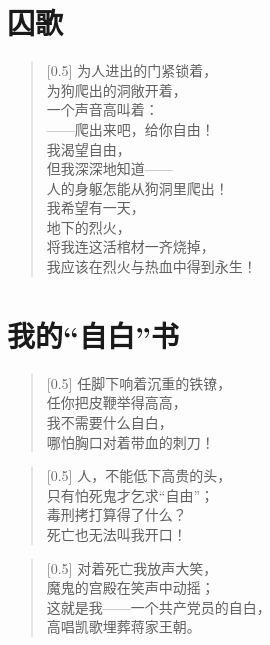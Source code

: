 \documentclass[12pt,UTF-8,openany]{ctexbook}
\begin{document}
\chapter{囚歌}

\begin{large}
    
    \begin{verse}[0.5\linewidth]
        为人进出的门紧锁着， \\
        为狗爬出的洞敞开着， \\
        一个声音高叫着： \\
        ——爬出来吧，给你自由！ \\
        我渴望自由， \\
        但我深深地知道—— \\
        人的身躯怎能从狗洞里爬出！ \\
        我希望有一天， \\
        地下的烈火， \\
        将我连这活棺材一齐烧掉， \\
        我应该在烈火与热血中得到永生！
    \end{verse}
    
\end{large}



\chapter{我的“自白”书}

\begin{large}
    
    \begin{verse}[0.5\linewidth]
        任脚下响着沉重的铁镣， \\
        任你把皮鞭举得高高， \\
        我不需要什么自白， \\
        哪怕胸口对着带血的刺刀！
    \end{verse}
    
    
    \begin{verse}[0.5\linewidth]
        人，不能低下高贵的头， \\
        只有怕死鬼才乞求“自由”； \\
        毒刑拷打算得了什么？ \\
        死亡也无法叫我开口！
    \end{verse}
    
    
    \begin{verse}[0.5\linewidth]
        对着死亡我放声大笑， \\
        魔鬼的宫殿在笑声中动摇； \\
        这就是我——一个共产党员的自白， \\
        高唱凯歌埋葬蒋家王朝。
    \end{verse}
    
\end{large}
\end{document}
